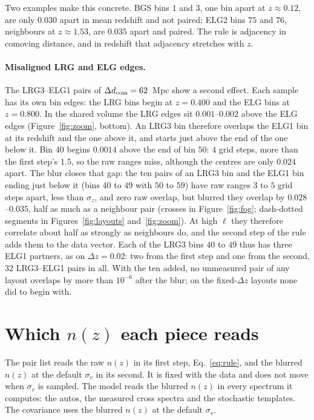 \documentclass[11pt]{article}
\newcommand{\dcom}{$\Delta d_{\rm com} = 62$~Mpc}
\newcommand{\sv}{\sigma_v}
\begin{document}
Two examples make this concrete.  BGS bins $1$ and $3$, one bin apart
at $z \approx 0.12$, are only $0.030$ apart in mean redshift and not
paired; ELG2 bins $75$ and $76$, neighbours at $z \approx 1.53$, are
$0.035$ apart and paired.  The rule is adjacency in comoving distance,
and in redshift that adjacency stretches with $z$.

\paragraph{Misaligned LRG and ELG edges.}
The LRG3--ELG1 pairs of \dcom{} show a second effect.  Each sample has
its own bin edges: the LRG
bins begin at $z = 0.400$ and the ELG bins at $z = 0.800$.  In the
shared volume the LRG edges sit $0.001$--$0.002$ above the ELG edges
(Figure~\ref{fig:zoom}, bottom).  An LRG3 bin therefore
overlaps the ELG1 bin at its redshift and the one above it, and starts
just above the end of the one below it.  Bin $40$ begins $0.0014$ above
the end of bin $50$: $4$ grid steps, more than the first step's $1.5$,
so the raw ranges miss, although the centres are only $0.024$ apart.
The blur closes that gap: the ten pairs of an LRG3 bin and the ELG1
bin ending just below it (bins $40$ to $49$ with $50$ to $59$) have
raw ranges $3$ to $5$ grid steps apart, less than $\sigma_z$, and zero
raw overlap, but blurred they overlap by $0.028$--$0.035$, half as
much as a neighbour pair (crosses in Figure~\ref{fig:fog};
dash-dotted segments in Figures~\ref{fig:layouts}
and~\ref{fig:zoom}).  At high $\ell$ they therefore correlate about
half as strongly as neighbours do, and the second step of the rule
adds them to the data vector.  Each of the LRG3 bins $40$ to $49$ thus
has three ELG1 partners, as on $\Delta z = 0.02$: two from the first
step and one from the second, $32$ LRG3--ELG1 pairs in all.  With the
ten added, no unmeasured pair of any layout overlaps by more than
$10^{-6}$ after the blur; on the fixed-$\Delta z$ layouts none did to
begin with.

\section{Which $n(z)$ each piece reads}

The pair list reads the raw $n(z)$ in its first step,
Eq.~\eqref{eq:rule}, and the blurred $n(z)$ at the default $\sv$ in
its second.  It is fixed with the data and does not move when $\sv$ is
sampled.  The model reads the blurred $n(z)$ in every spectrum it
computes: the autos, the measured cross spectra and the stochastic
templates.  The covariance uses the blurred $n(z)$ at the default
$\sv$.
\end{document}
